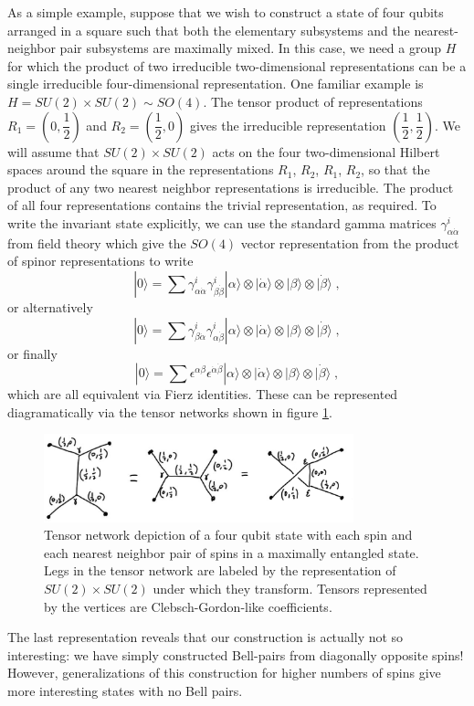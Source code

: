 \documentclass[12pt]{article}
\theoremstyle{definition}
\newcommand{\be}{\begin{equation}}
\newcommand{\ee}{\end{equation}}
\begin{document}
As a simple example, suppose that we wish to construct a state of four qubits arranged in a square such that both the elementary subsystems and the nearest-neighbor pair subsystems are maximally mixed. In this case, we need a group $H$ for which the product of two irreducible two-dimensional representations can be a single irreducible four-dimensional representation. One familiar example is $H = SU(2) \times SU(2) \sim SO(4)$. The tensor product of representations $R_1 = (0, \dfrac{1}{2})$ and  $R_2 = (\dfrac{1}{2}, 0)$ gives the irreducible representation $(\dfrac{1}{2}, \dfrac{1}{2})$. We will assume that $SU(2) \times SU(2)$ acts on the four two-dimensional Hilbert spaces around the square in the representations $R_1$, $R_2$, $R_1$, $R_2$, so that the product of any two nearest neighbor representations is irreducible. The product of all four representations contains the trivial representation, as required. To write the invariant state explicitly, we can use the standard gamma matrices $\gamma^i_{\alpha \dot{\alpha}} $ from field theory which give the $SO(4)$ vector representation from the product of spinor representations to write
\be
|0 \rangle = \sum \gamma^i_{\alpha \dot{\alpha}} \gamma^i_{\beta \dot{\beta}} |\alpha \rangle \otimes |\dot{\alpha} \rangle \otimes |\beta \rangle \otimes |\dot{\beta} \rangle \; ,
\ee
or alternatively
\be
|0 \rangle = \sum \gamma^i_{\beta \dot{\alpha}} \gamma^i_{\alpha \dot{\beta}} |\alpha \rangle \otimes |\dot{\alpha} \rangle \otimes |\beta \rangle \otimes |\dot{\beta} \rangle \; ,
\ee
or finally
\be
|0 \rangle = \sum \epsilon^{\alpha \beta} \epsilon^{\dot{\alpha} \dot{\beta}} |\alpha \rangle \otimes |\dot{\alpha} \rangle \otimes |\beta \rangle \otimes |\dot{\beta} \rangle \; ,
\ee
which are all equivalent via Fierz identities. These can be represented diagramatically via the tensor networks shown in figure \ref{group1}.
\begin{figure}
\centering
\includegraphics[width=0.8\textwidth]{group1.eps}
\caption{Tensor network depiction of a four qubit state with each spin and each nearest neighbor pair of spins in a maximally entangled state. Legs in the tensor network are labeled by the representation of $SU(2) \times SU(2)$ under which they transform. Tensors represented by the vertices are Clebsch-Gordon-like coefficients.}
\label{group1}
\end{figure}
The last representation reveals that our construction is actually not so interesting: we have simply constructed Bell-pairs from diagonally opposite spins! However, generalizations of this construction for higher numbers of spins give more interesting states with no Bell pairs.
\end{document}
